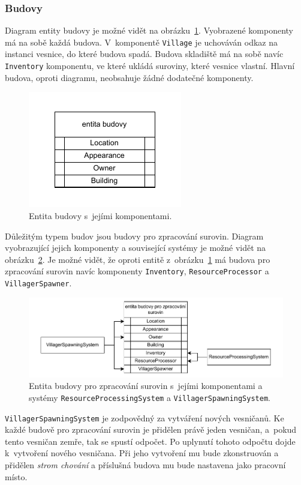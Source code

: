 \subsubsection{Budovy}
Diagram entity budovy je možné vidět na obrázku~\ref{fig:building}. Vyobrazené komponenty má na sobě každá budova. V~komponentě \texttt{Village} je uchováván odkaz na instanci vesnice, do které budova spadá. Budova skladiště má na sobě navíc \texttt{Inventory} komponentu, ve které ukládá suroviny, které vesnice vlastní. Hlavní budova, oproti diagramu, neobsahuje žádné dodatečné komponenty.

\begin{figure}[!htb]
  \centering
  \includegraphics[width=0.4\linewidth]{img/building.pdf}
  \caption{Entita budovy s~jejími komponentami.}
  \label{fig:building}
\end{figure}

Důležitým typem budov jsou budovy pro zpracování surovin. Diagram vyobrazující jejich komponenty a související systémy je možné vidět na obrázku~\ref{fig:res_building}. Je možné vidět, že oproti entitě z~obrázku~\ref{fig:building} má budova pro zpracování surovin navíc komponenty \texttt{Inventory}, \texttt{ResourceProcessor} a \texttt{VillagerSpawner}.

\begin{figure}[!htb]
  \centering
  \includegraphics[width=1.0\linewidth]{img/resource_building.pdf}
  \caption{Entita budovy pro zpracování surovin s~jejími komponentami a systémy \texttt{ResourceProcessingSystem} a \texttt{VillagerSpawningSystem}.}
  \label{fig:res_building}
\end{figure}

\texttt{VillagerSpawningSystem} je zodpovědný za vytváření nových vesničanů. Ke každé budově pro zpracování surovin je přidělen právě jeden vesničan, a~pokud tento vesničan zemře, tak se spustí odpočet. Po uplynutí tohoto odpočtu dojde k~vytvoření nového vesničana. Při jeho vytvoření mu bude zkonstruován a přidělen \textit{strom chování} a příslušná budova mu bude nastavena jako pracovní místo.

